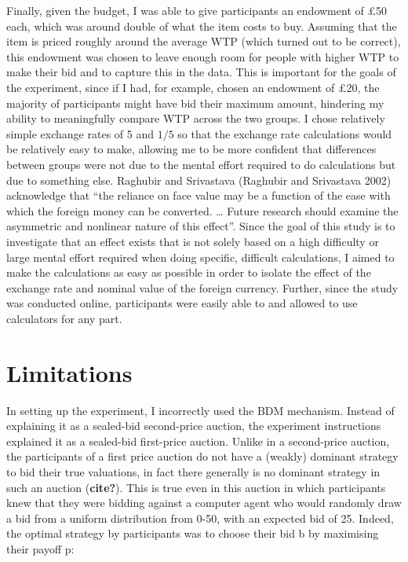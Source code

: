 \documentclass[
]{report}
\begin{document}
Finally, given the budget, I was able to give participants an endowment
of £50 each, which was around double of what the item costs to buy.
Assuming that the item is priced roughly around the average WTP (which
turned out to be correct), this endowment was chosen to leave enough
room for people with higher WTP to make their bid and to capture this in
the data. This is important for the goals of the experiment, since if I
had, for example, chosen an endowment of £20, the majority of
participants might have bid their maximum amount, hindering my ability
to meaningfully compare WTP across the two groups. I chose relatively
simple exchange rates of 5 and \(1/5\) so that the exchange rate
calculations would be relatively easy to make, allowing me to be more
confident that differences between groups were not due to the mental
effort required to do calculations but due to something else. Raghubir
and Srivastava (Raghubir and Srivastava 2002) acknowledge that ``the
reliance on face value may be a function of the ease with which the
foreign money can be converted. \ldots{} Future research should examine
the asymmetric and nonlinear nature of this effect''. Since the goal of
this study is to investigate that an effect exists that is not solely
based on a high difficulty or large mental effort required when doing
specific, difficult calculations, I aimed to make the calculations as
easy as possible in order to isolate the effect of the exchange rate and
nominal value of the foreign currency. Further, since the study was
conducted online, participants were easily able to and allowed to use
calculators for any part.

\section{Limitations}\label{limitations}

In setting up the experiment, I incorrectly used the BDM mechanism.
Instead of explaining it as a sealed-bid second-price auction, the
experiment instructions explained it as a sealed-bid first-price
auction. Unlike in a second-price auction, the participants of a first
price auction do not have a (weakly) dominant strategy to bid their true
valuations, in fact there generally is no dominant strategy in such an
auction (\textbf{cite?}). This is true even in this auction in which
participants knew that they were bidding against a computer agent who
would randomly draw a bid from a uniform distribution from 0-50, with an
expected bid of 25. Indeed, the optimal strategy by participants was to
choose their bid b by maximising their payoff p:
\end{document}
